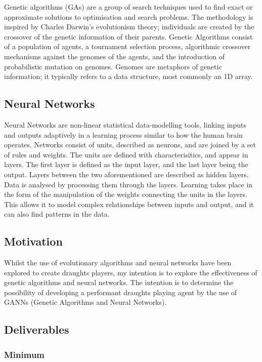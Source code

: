 \documentclass[12pt,a4paper]{article}
\begin{document}
    Genetic algorithms (GAs) are a group of search techniques used to find exact or approximate solutions to optimisation and search problems. The methodology is inspired by Charles Darwin's evolutionism theory; individuals are created by the crossover of the genetic information of their parents. Genetic Algorithms consist of a population of agents, a tournament selection process, algorithmic crossover mechanisms against the genomes of the agents, and the introduction of probabilistic mutation on genomes. Genomes are metaphors of genetic information; it typically refers to a data structure, most commonly an 1D array.

\subsection*{Neural Networks}

    Neural Networks are non-linear statistical data-modelling tools, linking inputs and outputs adaptively in a learning process similar to how the human brain operates. Networks consist of units, described as neurons, and are joined by a set of rules and weights. The units are defined with characterisitics, and appear in layers. The first layer is defined as the input layer, and the last layer being the output. Layers between the two aforementioned are described as hidden layers. Data is analysed by processing them through the layers. Learning takes place in the form of the manipulation of the weights connecting the units in the layers. This allows it to model complex relationships between inputs and output, and it can also find patterns in the data. 

\subsection*{Motivation}
    Whilst the use of evolutionary algorithms and neural networks have been explored to create draughts players, my intention is to explore the effectiveness of genetic algorithms and neural networks. The intention is to determine the possibility of developing a performant draughts playing agent by the use of GANNs (Genetic Algorithms and Neural Networks).

\subsection*{Deliverables}

    \subsubsection*{Minimum}
\end{document}
